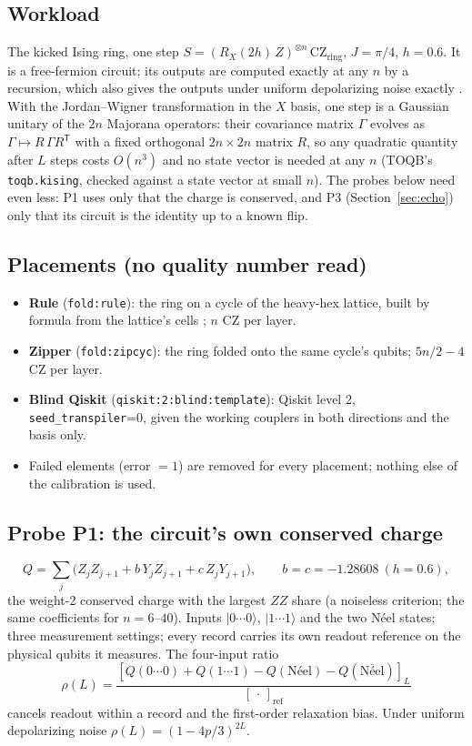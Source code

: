 \documentclass[11pt]{article}
\begin{document}
\subsection{Workload}
The kicked Ising ring, one step $S=(R_X(2h)\,Z)^{\otimes n}\,\mathrm{CZ}_{\mathrm{ring}}$, $J=\pi/4$, $h=0.6$. It is a
free-fermion circuit; its outputs are computed exactly at any $n$ by a recursion, which also gives the outputs under
uniform depolarizing noise exactly \cite{pocklington2026}. With the Jordan--Wigner transformation in the $X$ basis,
one step is a Gaussian unitary of the $2n$ Majorana operators: their covariance matrix $\Gamma$ evolves as
$\Gamma\mapsto R\,\Gamma R^{\mathsf T}$ with a fixed orthogonal $2n\times2n$ matrix $R$, so any quadratic quantity after
$L$ steps costs $O(n^3)$ and no state vector is needed at any $n$ (TOQB's \texttt{toqb.kising}, checked against a state
vector at small $n$). The probes below need even less: P1 uses only that the charge is conserved, and P3
(Section~\ref{sec:echo}) only that its circuit is the identity up to a known flip.

\subsection{Placements (no quality number read)}
\begin{itemize}
\item \textbf{Rule} (\texttt{fold:rule}): the ring on a cycle of the heavy-hex lattice, built by formula from the
  lattice's cells \cite{paper4}; $n$ CZ per layer.
\item \textbf{Zipper} (\texttt{fold:zipcyc}): the ring folded onto the same cycle's qubits; $5n/2-4$ CZ per layer.
\item \textbf{Blind Qiskit} (\texttt{qiskit:2:blind:template}): Qiskit level 2, \texttt{seed\_transpiler}=0, given the
  working couplers in both directions and the basis only.
\item Failed elements (error $=1$) are removed for every placement; nothing else of the calibration is used.
\end{itemize}

\subsection{Probe P1: the circuit's own conserved charge}
\[
Q=\sum_j \bigl(Z_jZ_{j+1}+b\,Y_jZ_{j+1}+c\,Z_jY_{j+1}\bigr),\qquad b=c=-1.28608\ (h=0.6),
\]
the weight-2 conserved charge with the largest $ZZ$ share (a noiseless criterion; the same coefficients for
$n=6$--$40$). Inputs $|0\cdots0\rangle$, $|1\cdots1\rangle$ and the two N\'eel states; three measurement settings;
every record carries its own readout reference on the physical qubits it measures. The four-input ratio
\[
\rho(L)=\frac{[Q(0\cdots0)+Q(1\cdots1)-Q(\text{N\'eel})-Q(\overline{\text{N\'eel}})]_L}{[\,\cdot\,]_{\mathrm{ref}}}
\]
cancels readout within a record and the first-order relaxation bias. Under uniform depolarizing noise
$\rho(L)=(1-4p/3)^{2L}$.
\end{document}
